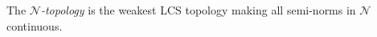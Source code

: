 The \emph{$\mathcal{N}$-topology} is the weakest LCS topology making all semi-norms in $\mathcal{N}$ continuous.
